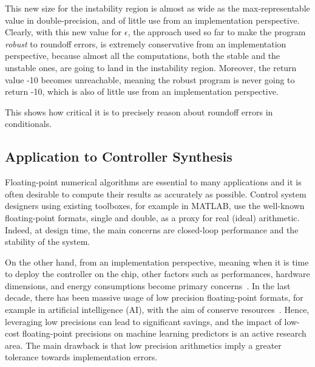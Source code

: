 This new size for the instability region is almost as wide as the max-representable value in double-precision, and of little use from an implementation perspective. 
%
Clearly, with this new value for $\epsilon$, the approach used so far to make the program \emph{robust} to roundoff errors, is extremely conservative from an implementation perspective, because almost all the computations, both the stable and the unstable ones, are going to land in the instability region.
%
Moreover, the return value -10 becomes unreachable, meaning the robust program is never going to return -10, which is also of little use from an implementation perspective.
%
%

This shows how critical it is to precisely reason about roundoff errors in conditionals.
%
\subsection{Application to Controller Synthesis}
\label{controllers}
%
Floating-point numerical algorithms are essential to many applications and it is often desirable to compute their results as accurately as possible.
%
Control system designers using existing toolboxes, for example in MATLAB, use the well-known floating-point formats, single and double, as a proxy for real (ideal) arithmetic. 
%
Indeed, at design time, the main concerns are closed-loop performance and the stability of the system.
%

%
%
On the other hand, from an implementation perspective, meaning when it is time to deploy the controller on the chip, other factors such as performances, hardware dimensions, and energy consumptions become primary concerns~\cite{suardi}.
%
In the last decade, there has been massive usage of low precision floating-point formats, for example in artificial intelligence (AI), with the aim of conserve resources~\cite{fppower}.
%
Hence, leveraging low precisions can lead to significant savings, and the impact of low-cost floating-point precisions on machine learning predictors is an active research area.
%
The main drawback is that low precision arithmetics imply a greater tolerance towards implementation errors.
%

